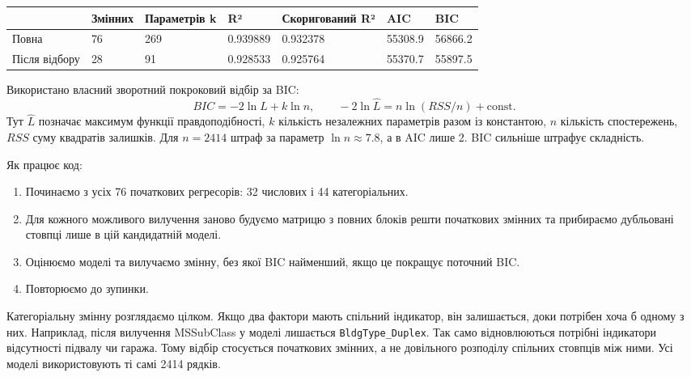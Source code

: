 \Needspace{46.8pt}


\begingroup\fontsize{7.5}{9.5}\selectfont\setlength{\tabcolsep}{2.5mm}\renewcommand{\arraystretch}{1.15}
\par\vspace{2pt}\noindent\begin{tabular}{|lllllll|}
\hline
 & Змінних & Параметрів k & R² & Скоригований R² & AIC & BIC \\
\hline
Повна & 76 & 269 & 0.939889 & 0.932378 & 55308.9 & 56866.2 \\
Після відбору & 28 & 91 & 0.928533 & 0.925764 & 55370.7 & 55897.5 \\
\hline
\end{tabular}\par\vspace{2pt}
\endgroup


\answerheading
Використано власний зворотний покроковий відбір за BIC:
\[BIC=-2\ln\widehat L+k\ln n,\qquad -2\ln\widehat L=n\ln(RSS/n)+\text{const}.\]
Тут \(\widehat L\) позначає максимум функції правдоподібності, \(k\)
кількість незалежних параметрів разом із константою, \(n\) кількість
спостережень, \(RSS\) суму квадратів залишків. Для \(n=2414\) штраф за
параметр \(\ln n\approx7.8\), а в AIC лише 2. BIC сильніше штрафує
складність.

Як працює код:

\begin{enumerate}
\def\labelenumi{\arabic{enumi}.}
\item
  Починаємо з усіх 76 початкових регресорів: 32 числових і 44
  категоріальних.
\item
  Для кожного можливого вилучення заново будуємо матрицю з повних блоків
  решти початкових змінних та прибираємо дубльовані стовпці лише в цій
  кандидатній моделі.
\item
  Оцінюємо моделі та вилучаємо змінну, без якої BIC найменший, якщо це
  покращує поточний BIC.
\item
  Повторюємо до зупинки.
\end{enumerate}

Категоріальну змінну розглядаємо цілком. Якщо два фактори мають спільний
індикатор, він залишається, доки потрібен хоча б одному з них.
Наприклад, після вилучення MSSubClass у моделі лишається
\texttt{BldgType\_Duplex}. Так само відновлюються потрібні індикатори
відсутності підвалу чи гаража. Тому відбір стосується початкових
змінних, а не довільного розподілу спільних стовпців між ними. Усі
моделі використовують ті самі 2414 рядків.

